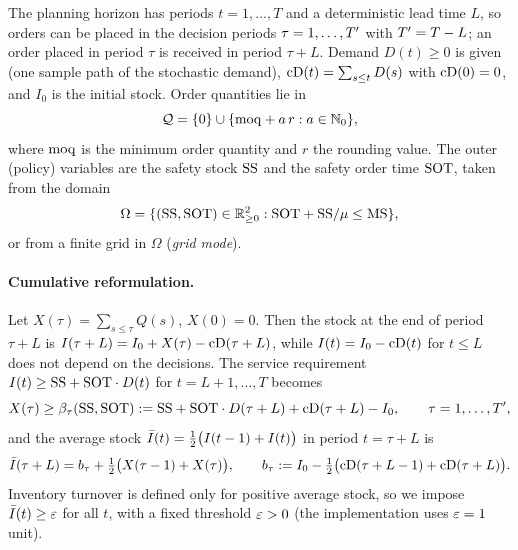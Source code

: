 The planning horizon has periods $t=1,\dots,T$ and a deterministic lead time $L$, so
orders can be placed in the decision periods $\tau=1,\dots,T'$ with $T'=T-L$; an order
placed in period $\tau$ is received in period $\tau+L$. Demand $D(t)\ge 0$ is given
(one sample path of the stochastic demand), $\mathrm{cD}(t)=\sum_{s\le t}D(s)$ with
$\mathrm{cD}(0)=0$, and $I_0$ is the initial stock. Order quantities lie in
\begin{equation}
  \mathcal{Q}=\{0\}\cup\{\mathrm{moq}+a\,r : a\in\mathbb{N}_0\},
\end{equation}
where $\mathrm{moq}$ is the minimum order quantity and $r$ the rounding value. The outer
(policy) variables are the safety stock $\mathrm{SS}$ and the safety order time $\mathrm{SOT}$, taken
from the domain
\begin{equation}
  \Omega=\{(\mathrm{SS},\mathrm{SOT})\in\mathbb{R}^2_{\ge 0} : \mathrm{SOT}+\mathrm{SS}/\mu\le\mathrm{MS}\},
\end{equation}
or from a finite grid in $\Omega$ (\emph{grid mode}).

\paragraph{Cumulative reformulation.}
Let $X(\tau)=\sum_{s\le\tau}Q(s)$, $X(0)=0$. Then the stock at the end of period
$\tau+L$ is $I(\tau+L)=I_0+X(\tau)-\mathrm{cD}(\tau+L)$, while $I(t)=I_0-\mathrm{cD}(t)$ for
$t\le L$ does not depend on the decisions. The service requirement
$I(t)\ge\mathrm{SS}+\mathrm{SOT}\cdot D(t)$ for $t=L+1,\dots,T$ becomes
\begin{equation}\label{eq:req}
  X(\tau)\ge\beta_\tau(\mathrm{SS},\mathrm{SOT})
  :=\mathrm{SS}+\mathrm{SOT}\cdot D(\tau+L)+\mathrm{cD}(\tau+L)-I_0,\qquad \tau=1,\dots,T',
\end{equation}
and the average stock $\bar I(t)=\tfrac12\bigl(I(t-1)+I(t)\bigr)$ in period $t=\tau+L$ is
\begin{equation}\label{eq:ibar}
  \bar I(\tau+L)=b_\tau+\tfrac12\bigl(X(\tau-1)+X(\tau)\bigr),\qquad
  b_\tau:=I_0-\tfrac12\bigl(\mathrm{cD}(\tau+L-1)+\mathrm{cD}(\tau+L)\bigr).
\end{equation}
Inventory turnover is defined only for positive average stock, so we impose
$\bar I(t)\ge\varepsilon$ for all $t$, with a fixed threshold $\varepsilon>0$ (the implementation
uses $\varepsilon=1$ unit).

